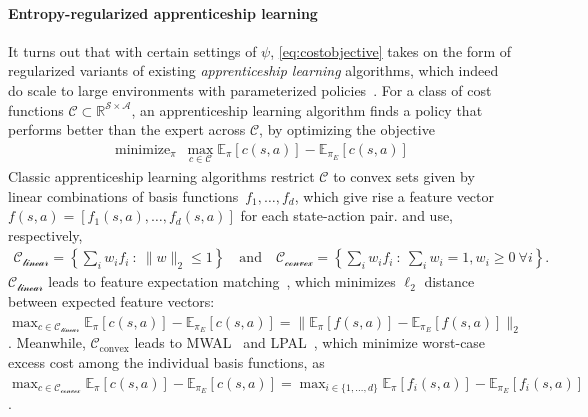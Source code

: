 \documentclass{article}
\newcommand\bbE{\ensuremath{\mathbb{E}}} %
\newcommand\allC{\ensuremath{\mathbb{R}^{\mathcal{S}\times\mathcal{A}}}}
\DeclareMathOperator*{\minimize}{minimize}
\newcommand{\1}{\mathbb{I}} %
\begin{document}
\paragraph{Entropy-regularized apprenticeship learning}
It turns out that with certain settings of $\psi$, \cref{eq:costobjective} takes on the form of regularized variants of existing \emph{apprenticeship learning} algorithms, which indeed do scale to large environments with parameterized policies~\citep{ho2016model}.
For a class of cost functions $\mathcal{C} \subset \allC$, an apprenticeship learning algorithm finds a policy that performs better than the expert across $\mathcal{C}$, by optimizing the objective
\begin{align}
\minimize_\pi\ \max_{c \in \mathcal{C}} \bbE_{\pi}[c(s,a)] - \bbE_{\pi_E}[c(s,a)] \label{eq:apprenticeship}
\end{align}
Classic apprenticeship learning algorithms restrict $\mathcal{C}$ to convex sets given by linear combinations of basis functions~$f_1, \dotsc, f_d$, which give rise a feature vector $f(s,a) = [f_1(s,a), \dotsc, f_d(s,a)]$ for each state-action pair.
\citet{abbeel2004apprenticeship} and \citet{syed2008apprenticeship} use, respectively,
\begin{align}
\mathcal{C_\text{linear}} = \left\{ \textstyle{\sum}_i w_i f_i \ :\  \|w\|_2 \leq 1 \right\} \quad \text{and}\quad
\mathcal{C_\text{convex}} = \left\{ \textstyle{\sum}_i w_i f_i \ :\  \textstyle{\sum}_i w_i = 1, w_i \geq 0 \ \forall i \right\}. \label{eq:linconvcosts}
\end{align}
$\mathcal{C_\text{linear}}$ leads to feature expectation matching~\citep{abbeel2004apprenticeship}, which minimizes $\ell_2$ distance between expected feature vectors: $\max_{c \in \mathcal{C_\text{linear}}} \bbE_{\pi}[c(s,a)] - \bbE_{\pi_E}[c(s,a)] = \|\bbE_{\pi}[f(s,a)] - \bbE_{\pi_E}[f(s,a)] \|_2$.
Meanwhile, $\mathcal{C}_{\text{convex}}$ leads to  MWAL~\citep{syed2007game} and LPAL~\citep{syed2008apprenticeship}, which minimize worst-case excess cost among the individual basis functions, as $\max_{c \in \mathcal{C_\text{convex}}} \bbE_{\pi}[c(s,a)] - \bbE_{\pi_E}[c(s,a)] = \max_{i \in \{1, \dotsc, d\}} \bbE_{\pi}[f_i(s,a)] - \bbE_{\pi_E}[f_i(s,a)]$.
\end{document}

